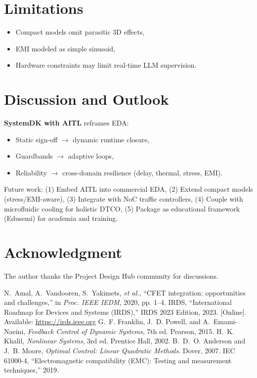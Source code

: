 \documentclass[conference]{IEEEtran}
\begin{document}
\section{Limitations}
\begin{itemize}
  \item Compact models omit parasitic 3D effects,
  \item EMI modeled as simple sinusoid,
  \item Hardware constraints may limit real-time LLM supervision.
\end{itemize}

\section{Discussion and Outlook}
\textbf{SystemDK with AITL} reframes EDA:
\begin{itemize}
  \item Static sign-off $\to$ dynamic runtime closure,
  \item Guardbands $\to$ adaptive loops,
  \item Reliability $\to$ cross-domain resilience (delay, thermal, stress, EMI).
\end{itemize}
Future work:
(1) Embed AITL into commercial EDA,
(2) Extend compact models (stress/EMI-aware),
(3) Integrate with NoC traffic controllers,
(4) Couple with microfluidic cooling for holistic DTCO,
(5) Package as educational framework (Edusemi) for academia and training.

\section*{Acknowledgment}
The author thanks the Project Design Hub community for discussions.

\vfill
\begin{thebibliography}{1}
 N.~Amal, A.~Vandooren, S.~Yakimets, \textit{et al.}, ``CFET integration: opportunities and challenges,'' in \emph{Proc. IEEE IEDM}, 2020, pp. 1--4.
 IRDS, ``International Roadmap for Devices and Systems (IRDS),'' IRDS 2023 Edition, 2023. [Online]. Available: \url{https://irds.ieee.org}
 G.~F. Franklin, J.~D. Powell, and A.~Emami-Naeini, \emph{Feedback Control of Dynamic Systems}, 7th ed. Pearson, 2015.
 H.~K. Khalil, \emph{Nonlinear Systems}, 3rd ed. Prentice Hall, 2002.
 B.~D.~O. Anderson and J.~B. Moore, \emph{Optimal Control: Linear Quadratic Methods}. Dover, 2007.
 IEC 61000-4, ``Electromagnetic compatibility (EMC): Testing and measurement techniques,'' 2019.
\end{thebibliography}
\end{document}

